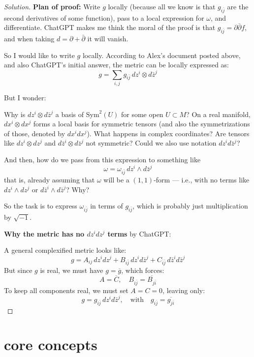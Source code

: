 \begin{proof}[Solution]\leavevmode
\textbf{Plan of proof:} Write \( g \) locally (because all we know is that \( g_{i\bar{j}} \) are the second derivatives of some function), pass to a local expression for \( \omega \), and differentiate. ChatGPT makes me think the moral of the proof is that \( g_{i\bar{j}} = \partial \bar{\partial} f \), and when taking \( d = \partial + \bar{\partial} \) it will vanish.

So I would like to write \( g \) locally. According to Alex’s document posted above, and also ChatGPT’s initial answer, the metric can be locally expressed as:
\[
g = \sum_{i,j} g_{i \bar{j}} \, dz^i \otimes d\bar{z}^j
\]

But I wonder:

Why is \( dz^i \otimes d\bar{z}^j \) a basis of \( \mathrm{Sym}^2(U) \) for some open \( U \subset M \)? On a real manifold, \( dx^i \otimes dx^j \) forms a local basis for symmetric tensors (and also the symmetrizations of those, denoted by \( dx^i dx^j \)). What happens in complex coordinates? Are tensors like \( dz^i \otimes dz^j \) and \( d\bar{z}^i \otimes d\bar{z}^j \) not symmetric? Could we also use notation \( dz^i d\bar{z}^j \)?

And then, how do we pass from this expression to something like
\[
\omega = \omega_{i \bar{j}} \, dz^i \wedge d\bar{z}^j
\]
that is, already assuming that \( \omega \) will be a \((1,1)\)-form — i.e., with no terms like \( dz^i \wedge dz^j \) or \( d\bar{z}^i \wedge d\bar{z}^j \)? Why?

So the task is to express \( \omega_{i \bar{j}} \) in terms of \( g_{i \bar{j}} \), which is probably just multiplication by \( \sqrt{-1} \).

\bigskip

\textbf{Why the metric has no \( dz^i dz^j \) terms} by ChatGPT:

A general complexified metric looks like:
\[
g = A_{ij} \, dz^i dz^j + B_{i\bar{j}} \, dz^i d\bar{z}^j + C_{\bar{i} \bar{j}} \, d\bar{z}^i d\bar{z}^j
\]
But since \( g \) is real, we must have \( g = \overline{g} \), which forces:
\[
A = \overline{C}, \quad B_{i\bar{j}} = \overline{B_{j\bar{i}}}
\]
To keep all components real, we must set \( A = C = 0 \), leaving only:
\[
g = g_{i\bar{j}} \, dz^i d\bar{z}^j, \quad \text{with} \quad g_{i\bar{j}} = \overline{g_{j\bar{i}}}
\]
\end{proof}

\section{core concepts}

